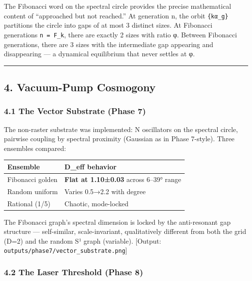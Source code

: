 \documentclass[
]{article}
\begin{document}
The Fibonacci word on the spectral circle provides the precise
mathematical content of ``approached but not reached.'' At generation n,
the orbit \texttt{\{kα\_g\}} partitions the circle into gaps of at most
3 distinct sizes. At Fibonacci generations \texttt{n\ =\ F\_k}, there
are exactly 2 sizes with ratio φ. Between Fibonacci generations, there
are 3 sizes with the intermediate gap appearing and disappearing --- a
dynamical equilibrium that never settles at φ.

\begin{center}\rule{0.5\linewidth}{0.5pt}\end{center}

\subsection{4. Vacuum-Pump Cosmogony}\label{vacuum-pump-cosmogony}

\subsubsection{4.1 The Vector Substrate (Phase
7)}\label{the-vector-substrate-phase-7}

The non-raster substrate was implemented: N oscillators on the spectral
circle, pairwise coupling by spectral proximity (Gaussian as in Phase
7-style). Three ensembles compared:

\begin{longtable}[]{@{}ll@{}}
\toprule\noalign{}
Ensemble & D\_eff behavior \\
\midrule\noalign{}
\endhead
\bottomrule\noalign{}
\endlastfoot
Fibonacci golden & \textbf{Flat at 1.10±0.03} across 6--39° range \\
Random uniform & Varies 0.5→2.2 with degree \\
Rational (1/5) & Chaotic, mode-locked \\
\end{longtable}

The Fibonacci graph's spectral dimension is locked by the anti-resonant
gap structure --- self-similar, scale-invariant, qualitatively different
from both the grid (D=2) and the random S¹ graph (variable). {[}Output:
\texttt{outputs/phase7/vector\_substrate.png}{]}

\subsubsection{4.2 The Laser Threshold (Phase
8)}\label{the-laser-threshold-phase-8}
\end{document}
